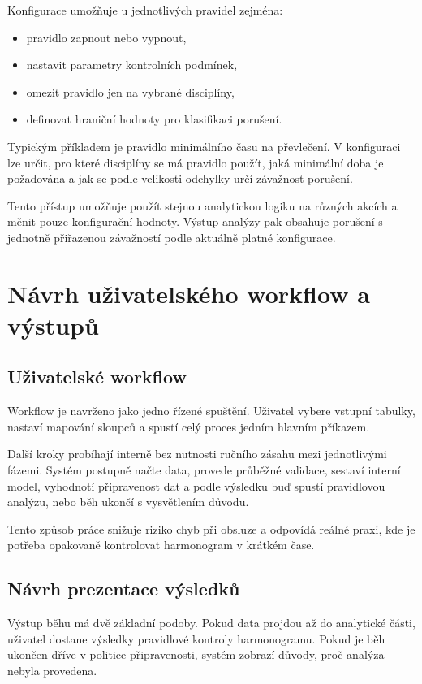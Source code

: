 \documentclass[czech, kiv, ba, he, iso690alph, pdf]{fasthesis}
\begin{document}
				Konfigurace umožňuje u jednotlivých pravidel zejména:
				\begin{itemize}
					\item pravidlo zapnout nebo vypnout,
					\item nastavit parametry kontrolních podmínek,
					\item omezit pravidlo jen na vybrané disciplíny,
					\item definovat hraniční hodnoty pro klasifikaci porušení.
				\end{itemize}
	
				Typickým příkladem je pravidlo minimálního času na převlečení. V konfiguraci lze určit, pro které disciplíny se má pravidlo použít, jaká minimální doba je požadována a jak se podle velikosti odchylky určí závažnost porušení.
	
				Tento přístup umožňuje použít stejnou analytickou logiku na různých akcích a měnit pouze konfigurační hodnoty. Výstup analýzy pak obsahuje porušení s jednotně přiřazenou závažností podle aktuálně platné konfigurace.
	
		\section{Návrh uživatelského workflow a výstupů}
	
			\subsection{Uživatelské workflow}
				Workflow je navrženo jako jedno řízené spuštění. Uživatel vybere vstupní tabulky, nastaví mapování sloupců a spustí celý proces jedním hlavním příkazem.
	
				Další kroky probíhají interně bez nutnosti ručního zásahu mezi jednotlivými fázemi. Systém postupně načte data, provede průběžné validace, sestaví interní model, vyhodnotí připravenost dat a podle výsledku buď spustí pravidlovou analýzu, nebo běh ukončí s vysvětlením důvodu.
	
				Tento způsob práce snižuje riziko chyb při obsluze a odpovídá reálné praxi, kde je potřeba opakovaně kontrolovat harmonogram v krátkém čase.
	
			\subsection{Návrh prezentace výsledků}
				Výstup běhu má dvě základní podoby. Pokud data projdou až do analytické části, uživatel dostane výsledky pravidlové kontroly harmonogramu. Pokud je běh ukončen dříve v politice připravenosti, systém zobrazí důvody, proč analýza nebyla provedena.
	
\end{document}
